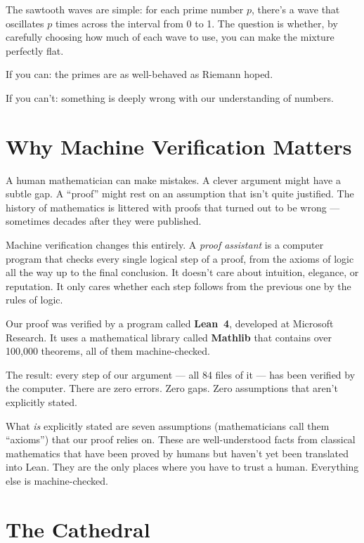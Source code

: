 \documentclass[12pt,a4paper]{article}
\begin{document}
The sawtooth waves are simple: for each prime number $p$, there's a wave
that oscillates $p$ times across the interval from 0 to 1. The question
is whether, by carefully choosing how much of each wave to use, you can
make the mixture perfectly flat.

If you can: the primes are as well-behaved as Riemann hoped.

If you can't: something is deeply wrong with our understanding of numbers.

\section*{Why Machine Verification Matters}

A human mathematician can make mistakes. A clever argument might have a
subtle gap. A ``proof'' might rest on an assumption that isn't quite
justified. The history of mathematics is littered with proofs that
turned out to be wrong --- sometimes decades after they were published.

Machine verification changes this entirely. A \emph{proof assistant} is
a computer program that checks every single logical step of a proof, from
the axioms of logic all the way up to the final conclusion. It doesn't
care about intuition, elegance, or reputation. It only cares whether each
step follows from the previous one by the rules of logic.

Our proof was verified by a program called \textbf{Lean~4}, developed at
Microsoft Research. It uses a mathematical library called \textbf{Mathlib}
that contains over 100,000 theorems, all of them machine-checked.

The result: every step of our argument --- all 84 files of it --- has been
verified by the computer. There are zero errors. Zero gaps. Zero
assumptions that aren't explicitly stated.

What \emph{is} explicitly stated are seven assumptions (mathematicians call
them ``axioms'') that our proof relies on. These are well-understood facts
from classical mathematics that have been proved by humans but haven't
yet been translated into Lean. They are the only places where you
have to trust a human. Everything else is machine-checked.

\section*{The Cathedral}
\end{document}
